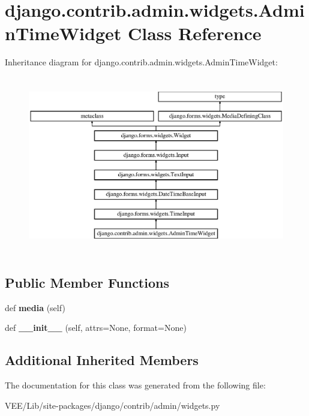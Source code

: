 \hypertarget{classdjango_1_1contrib_1_1admin_1_1widgets_1_1_admin_time_widget}{}\section{django.\+contrib.\+admin.\+widgets.\+Admin\+Time\+Widget Class Reference}
\label{classdjango_1_1contrib_1_1admin_1_1widgets_1_1_admin_time_widget}
Inheritance diagram for django.\+contrib.\+admin.\+widgets.\+Admin\+Time\+Widget\+:\begin{figure}[H]
\begin{center}
\leavevmode
\includegraphics[height=7.804878cm]{classdjango_1_1contrib_1_1admin_1_1widgets_1_1_admin_time_widget}
\end{center}
\end{figure}
\subsection*{Public Member Functions}
\begin{DoxyCompactItemize}
\item 
\mbox{\label{classdjango_1_1contrib_1_1admin_1_1widgets_1_1_admin_time_widget_a550c1a628224b2c408cdc5f96384b185}} 
def {\bfseries media} (self)
\item 
\mbox{\label{classdjango_1_1contrib_1_1admin_1_1widgets_1_1_admin_time_widget_a61ba2ed879104e3175e15ddfd82a90ce}} 
def {\bfseries \+\_\+\+\_\+init\+\_\+\+\_\+} (self, attrs=None, format=None)
\end{DoxyCompactItemize}
\subsection*{Additional Inherited Members}


The documentation for this class was generated from the following file\+:\begin{DoxyCompactItemize}
\item 
V\+E\+E/\+Lib/site-\/packages/django/contrib/admin/widgets.\+py\end{DoxyCompactItemize}
